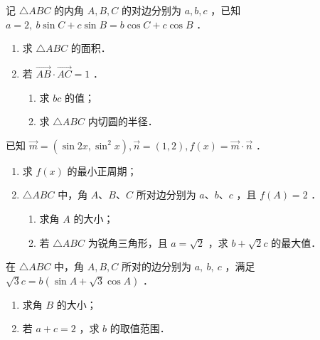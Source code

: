 \begin{example}
    记 $\triangle A B C$ 的内角 $A, B, C$ 的对边分别为 $a, b, c$ ，已知 $a=2, ~ b \sin C+c \sin B=b \cos C+c \cos B$ ．
    \begin{enumerate}
        \item 求 $\triangle A B C$ 的面积．
        \item 若 $\overrightarrow{A B} \cdot \overrightarrow{A C}=1$ ．
              \begin{enumerate}
                  \item 求 $b c$ 的值；
                  \item 求 $\triangle A B C$ 内切圆的半径．
              \end{enumerate}
    \end{enumerate}
\end{example}
\vspace{4em}

\begin{example}
    已知 $\overrightarrow{m}=\left(\sin 2 x, \sin ^2 x\right), \overrightarrow{n}=(1,2), f(x)=\overrightarrow{m} \cdot \overrightarrow{n}$ ．
    \begin{enumerate}
        \item 求 $f(x)$ 的最小正周期；
        \item $\triangle A B C$ 中，角 $A$、$B$、$C$ 所对边分别为 $a$、$b$、$c$ ，且 $f(A)=2$ ．
              \begin{enumerate}
                  \item 求角 $A$ 的大小；
                  \item 若 $\triangle A B C$ 为锐角三角形，且 $a=\sqrt{2}$ ，求 $b+\sqrt{2} c$ 的最大值．
              \end{enumerate}
    \end{enumerate}
\end{example}
\vspace{4em}

\begin{example}
    在 $\triangle A B C$ 中，角 $A, B, C$ 所对的边分别为 $a, ~ b, ~ c$ ，满足 $\sqrt{3} c=b(\sin A+\sqrt{3} \cos A)$ ．
    \begin{enumerate}
        \item 求角 $B$ 的大小；
        \item 若 $a+c=2$ ，求 $b$ 的取值范围．
    \end{enumerate}
\end{example}
\vspace{4em}

